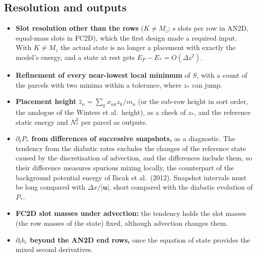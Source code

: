 \documentclass[11pt,a4paper]{article}
\newcommand{\zs}{z_{*}}
\begin{document}
\subsection{Resolution and outputs}
\begin{itemize}
  \item \textbf{Slot resolution other than the rows} ($K\ne M_z$; $s$ slots per row in AN2D, equal-mass slots in FC2D), which
        the first design made a required input. With $K\ne M_z$ the actual state is no longer a placement with exactly the
        model's energy, and a state at rest gets $E_P-E_*=O(\Delta z^2)$.
  \item \textbf{Refinement of every near-lowest local minimum} of $S$, with a count of the parcels with two minima within a
        tolerance, where $\zs$ can jump.
  \item \textbf{Placement height} $\hat z_n=\sum_kx_{nk}z_k/m_n$ (or the sub-row height in sort order, the analogue of the
        Winters et al.\ height), as a check of $\zs$, and the reference static energy and $N_*^2$ per parcel as outputs.
  \item \textbf{$\partial_tP_*$ from differences of successive snapshots,} as a diagnostic. The tendency from the diabatic rates
        excludes the changes of the reference state caused by the discretisation of advection, and the differences include
        them, so their difference measures spurious mixing locally, the counterpart of the background potential energy of
        Il{\i}cak et al.\ (2012). Snapshot intervals must be long compared with $\Delta x/|\mathbf u|$, short compared with the
        diabatic evolution of $P_*$.
  \item \textbf{FC2D slot masses under advection:} the tendency holds the slot masses (the row masses of the state) fixed,
        although advection changes them.
  \item \textbf{$\partial_tb_e$ beyond the AN2D end rows,} once the equation of state provides the mixed second derivatives.
\end{itemize}

\end{document}
